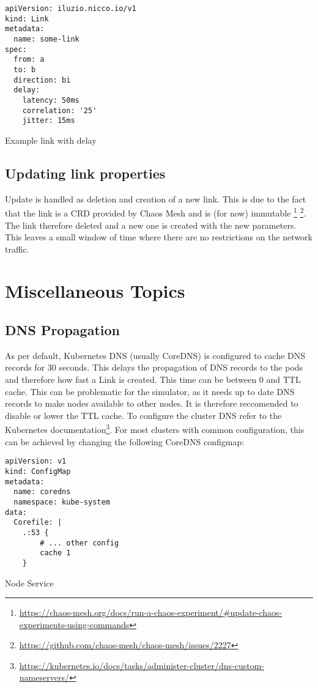\begin{listing}[H]
  \begin{verbatim}
apiVersion: iluzio.nicco.io/v1
kind: Link
metadata:
  name: some-link
spec:
  from: a
  to: b
  direction: bi
  delay:
    latency: 50ms
    correlation: '25'
    jitter: 15ms

  \end{verbatim}
  \caption{Example link with delay}
  \label{listing:link-example-delay}
\end{listing}


\subsection{Updating link properties}

Update is handled as deletion and creation of a new link.
This is due to the fact that the link is a CRD provided by Chaos Mesh and is (for now) immutable \footnote{\url{https://chaos-mesh.org/docs/run-a-chaos-experiment/\#update-chaos-experiments-using-commands}} \footnote{\url{https://github.com/chaos-mesh/chaos-mesh/issues/2227}}.
The link therefore deleted and a new one is created with the new parameters.
This leaves a small window of time where there are no restrictions on the network traffic.

\section{Miscellaneous Topics}

\subsection{DNS Propagation}

As per default, Kubernetes DNS (usually CoreDNS) is configured to cache DNS records for 30 seconds. This delays the propagation of DNS records to the pods and therefore how fast a Link is created. This time can be between 0 and TTL cache. This can be problematic for the simulator, as it needs up to date DNS records to make nodes available to other nodes. It is therefore reccomended to disable or lower the TTL cache. To configure the cluster DNS refer to the Kubernetes documentation\footnote{\url{https://kubernetes.io/docs/tasks/administer-cluster/dns-custom-nameservers/}}. For most clusters with common configuration, this can be achieved by changing the following CoreDNS configmap:

\begin{listing}[H]
  \begin{verbatim}
apiVersion: v1
kind: ConfigMap
metadata:
  name: coredns
  namespace: kube-system
data:
  Corefile: |
    .:53 {
        # ... other config
        cache 1
    }
  \end{verbatim}
  \caption{Node Service}
  \label{listing:coredns-configmap}
\end{listing}
